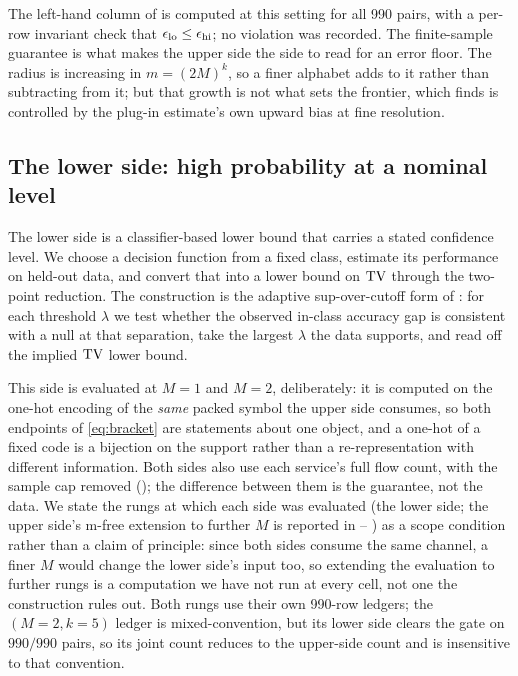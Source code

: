 The left-hand column of  is computed at this setting for all
990 pairs, with a per-row invariant check that $\epsilon_{\mathrm{lo}} \le \epsilon_{\mathrm{hi}}$; no violation
was recorded. The finite-sample guarantee is what makes the upper side the side
to read for an error floor. The radius is increasing in $m=(2M)^k$, so a finer
alphabet adds to it rather than subtracting from it; but that growth is not what
sets the frontier, which  finds is controlled by the
plug-in estimate's own upward bias at fine resolution.

\subsection{The lower side: high probability at a nominal level}
\label{sec:design/lower}

The lower side is a classifier-based lower bound that carries a stated
confidence level. We choose a decision function from a fixed class, estimate its
performance on held-out data, and convert that into a lower bound on $\mathrm{TV}$
through the two-point reduction. The construction is the adaptive sup-over-cutoff
form of \citet{michel2020high}: for each threshold $\lambda$ we test whether the
observed in-class accuracy gap is consistent with a null at that separation, take
the largest $\lambda$ the data supports, and read off the implied $\mathrm{TV}$ lower
bound.

This side is evaluated at $M{=}1$ and $M{=}2$, deliberately: it is computed on the
one-hot encoding of the \emph{same} packed symbol the upper side consumes, so
both endpoints of \eqref{eq:bracket} are statements about one object, and a
one-hot of a fixed code is a bijection on the support rather than a
re-representation with different information. Both sides also use each service's
full flow count, with the sample cap removed (); the
difference between them is the guarantee, not the data. We state the
rungs at which each side was evaluated (the lower side; the upper side's m-free
extension to further $M$ is reported in --%
) as a scope condition rather than a claim
of principle: since both sides consume the same channel, a finer $M$ would
change the lower side's input too, so extending the evaluation to further rungs
is a computation we have not run at every cell, not one the construction rules
out. Both rungs use their own 990-row ledgers; the $(M{=}2,k{=}5)$ ledger is
mixed-convention, but its lower side clears the gate on $990/990$ pairs, so its
joint count reduces to the upper-side count and is insensitive to that
convention.

